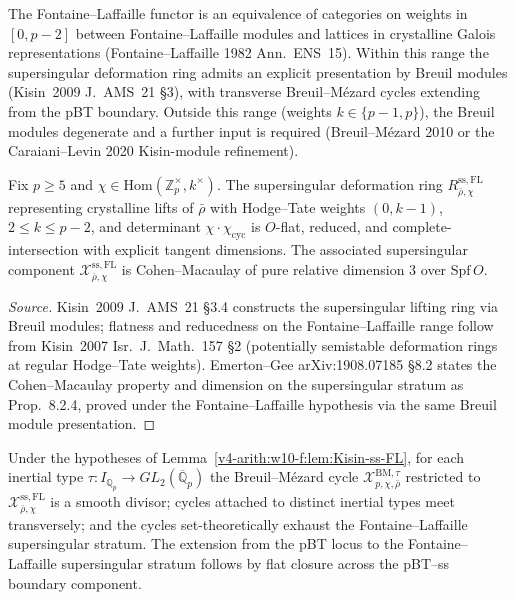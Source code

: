\begin{remark}
\label{v4-arith:w10-f:rem:FL-divide}
The Fontaine--Laffaille functor is an equivalence of categories on
weights in \([0,p-2]\) between Fontaine--Laffaille modules and lattices
in crystalline Galois representations (Fontaine--Laffaille 1982
Ann.~ENS~15). Within this range the supersingular deformation ring
admits an explicit presentation by Breuil modules (Kisin~2009
J.~AMS~21 \S 3), with transverse Breuil--M{\'e}zard cycles extending
from the pBT boundary. Outside this range (weights \(k\in\{p-1,p\}\)),
the Breuil modules degenerate and a further input is required
(Breuil--M{\'e}zard 2010 or the Caraiani--Levin 2020 Kisin-module
refinement).
\end{remark}

\begin{lemma}
\label{v4-arith:w10-f:lem:Kisin-ss-FL}
Fix \(p\geq 5\) and
\(\chi\in\mathrm{Hom}(\mathbb{Z}_{p}^{\times},k^{\times})\). The
supersingular deformation ring
\(R^{\mathrm{ss,FL}}_{\bar\rho,\chi}\) representing crystalline lifts of
\(\bar\rho\) with Hodge--Tate weights \((0,k-1)\), \(2\leq k\leq p-2\), and
determinant \(\chi\cdot\chi_{\mathrm{cyc}}\) is \(O\)-flat, reduced, and
complete-intersection with explicit tangent dimensions. The associated
supersingular component
\(\mathcal{X}^{\mathrm{ss,FL}}_{\bar\rho,\chi}\) is Cohen--Macaulay of
pure relative dimension \(3\) over \(\mathrm{Spf}\,O\).
\end{lemma}

\begin{proof}[Source]
Kisin~2009 J.~AMS~21 \S 3.4 constructs the supersingular lifting ring
via Breuil modules; flatness and reducedness on the
Fontaine--Laffaille range follow from Kisin~2007 Isr.~J.~Math.~157
\S 2 (potentially semistable deformation rings at regular
Hodge--Tate weights). Emerton--Gee arXiv:1908.07185 \S 8.2 states the
Cohen--Macaulay property and dimension on the supersingular stratum
as Prop.~8.2.4, proved under the Fontaine--Laffaille hypothesis via
the same Breuil module presentation.
\end{proof}

\begin{lemma}
\label{v4-arith:w10-f:lem:GK-ss-cycles}
Under the hypotheses of
Lemma~\ref{v4-arith:w10-f:lem:Kisin-ss-FL}, for each inertial type
\(\tau\colon I_{\mathbb{Q}_{p}}\to GL_{2}(\overline{\mathbb{Q}}_{p})\)
the Breuil--M{\'e}zard cycle
\(\mathcal{X}^{\mathrm{BM},\tau}_{p,\chi,\bar\rho}\) restricted to
\(\mathcal{X}^{\mathrm{ss,FL}}_{\bar\rho,\chi}\) is a smooth divisor;
cycles attached to distinct inertial types meet transversely;
and the cycles set-theoretically exhaust the Fontaine--Laffaille
supersingular stratum. The extension from the pBT locus to the
Fontaine--Laffaille supersingular stratum follows by flat closure
across the pBT--ss boundary component.
\end{lemma}

